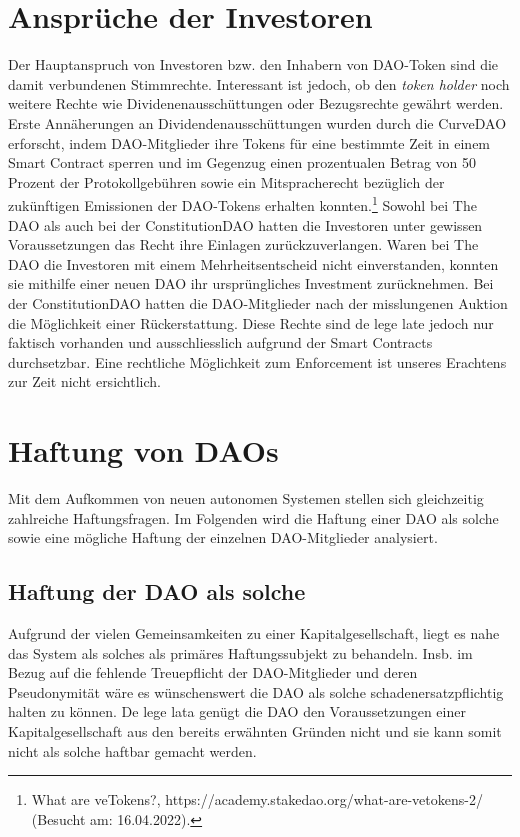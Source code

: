 \documentclass[a4paper,12pt]{report}
\begin{document}
	\section{Ansprüche der Investoren}
	\startsection
	Der Hauptanspruch von Investoren bzw. den Inhabern von DAO-Token sind die damit verbundenen Stimmrechte. Interessant ist jedoch, ob den \textit{token holder} noch weitere Rechte wie Dividenenausschüttungen oder Bezugsrechte gewährt werden. Erste Annäherungen an Dividendenausschüttungen wurden durch die CurveDAO erforscht, indem DAO-Mitglieder ihre Tokens für eine bestimmte Zeit in einem Smart Contract sperren und im Gegenzug einen prozentualen Betrag von 50 Prozent der Protokollgebühren sowie ein Mitspracherecht bezüglich der zukünftigen Emissionen der DAO-Tokens erhalten konnten.\footnote{\hspace{0.5em}\begin{minipage}[t]{13cm}What are veTokens?, https://academy.stakedao.org/what-are-vetokens-2/ (Besucht am: 16.04.2022).\end{minipage}} Sowohl bei The DAO als auch bei der ConstitutionDAO hatten die Investoren unter gewissen Voraussetzungen das Recht ihre Einlagen zurückzuverlangen. Waren bei The DAO die Investoren mit einem Mehrheitsentscheid nicht einverstanden, konnten sie mithilfe einer neuen DAO ihr ursprüngliches Investment zurücknehmen. Bei der ConstitutionDAO hatten die DAO-Mitglieder nach der misslungenen Auktion die Möglichkeit einer Rückerstattung. Diese Rechte sind de lege late jedoch nur faktisch vorhanden und ausschliesslich aufgrund der Smart Contracts durchsetzbar. Eine rechtliche Möglichkeit zum Enforcement ist unseres Erachtens zur Zeit nicht ersichtlich.
	\closesection
	
	\section{Haftung von DAOs}
	\startsection
	Mit dem Aufkommen von neuen autonomen Systemen stellen sich gleichzeitig zahlreiche Haftungsfragen. Im Folgenden wird die Haftung einer DAO als solche sowie eine mögliche Haftung der einzelnen DAO-Mitglieder analysiert.
	
	\subsection{Haftung der DAO als solche}
	\startsubsection
    Aufgrund der vielen Gemeinsamkeiten zu einer Kapitalgesellschaft, liegt es nahe das System als solches als primäres Haftungssubjekt zu behandeln. Insb. im Bezug auf die fehlende Treuepflicht der DAO-Mitglieder und deren Pseudonymität wäre es wünschenswert die DAO als solche schadenersatzpflichtig halten zu können. De lege lata genügt die DAO den Voraussetzungen einer Kapitalgesellschaft aus den bereits erwähnten Gründen nicht und sie kann somit nicht als solche haftbar gemacht werden. 
	\closesection
\end{document}
